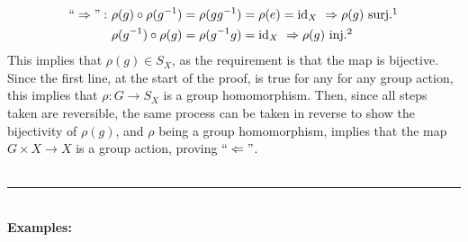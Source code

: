 \documentclass{article}
\begin{document}
\begin{align*}
``\Rightarrow":~&\rho(g)\circ\rho(g^{-1})=\rho(gg^{-1})=\rho(e)=\mathrm{id}_X ~\Rightarrow\rho(g)\text{ surj.}\footnotemark\\ &\rho(g^{-1})\circ\rho(g)=\rho(g^{-1}g)=\mathrm{id}_X~\Rightarrow\rho(g)\text{ inj.}\footnotemark
\end{align*}
This implies that $\rho(g)\in S_X$, as the requirement is that the map is bijective. Since the first line, at the start of the proof, is true for any for any group action, this implies that $\rho:G\rightarrow S_X$ is a group homomorphism. Then, since all steps taken are reversible, the same process can be taken in reverse to show the bijectivity of $\rho(g)$, and $\rho$ being a group homomorphism, implies that the map $G\times X\rightarrow X$ is a group action, proving $``\Leftarrow"$. \\
\vspace{2mm}~\\
\hrule
\vspace{2mm}~\\
\textbf{Examples:}
\end{document}
